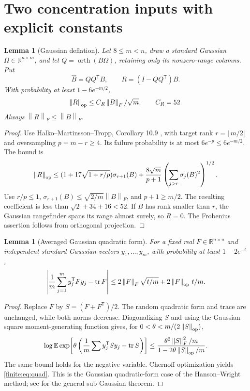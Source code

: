 \documentclass[11pt,oneside,openany,a4paper]{book}
\numberwithin{equation}{chapter}
\newtheorem{lemma}[theorem]{Lemma}
\theoremstyle{definition}
\theoremstyle{remark}
\newcommand{\R}{\mathbb R}\newcommand{\E}{\mathbb E}\newcommand{\Prb}{\mathbb P}\newcommand{\PP}{\mathbb P}
\newcommand{\T}{\mathsf T}\newcommand{\Id}{I}
\newcommand{\F}[1]{\left\lVert#1\right\rVert_F}
\newcommand{\op}[1]{\left\lVert#1\right\rVert_{\rm op}}
\DeclareMathOperator{\tr}{tr}\DeclareMathOperator{\rank}{rank}
\DeclareMathOperator{\orth}{orth}\DeclareMathOperator*{\argmin}{arg\,min}
\begin{document}
\section{Two concentration inputs with explicit constants}
\begin{lemma}[Gaussian deflation]\label{finite:lem:range}
Let $8\le m<n$, draw a standard Gaussian $\Omega\in\R^{n\times m}$, and let $Q=\orth(B\Omega)$, retaining only its nonzero-range columns. Put
\[
\widehat B=QQ^\T B,\qquad R=(I-QQ^\T)B.
\]
With probability at least $1-6e^{-m/2}$,
\begin{equation}\label{finite:eq:range}
\op R\le C_R\F B/\sqrt m,\qquad C_R=52.
\end{equation}
Always $\F R\le\F B$.
\end{lemma}
\begin{proof}
Use Halko--Martinsson--Tropp, Corollary 10.9 \cite{HMT}, with target rank $r=\lfloor m/2\rfloor$ and oversampling $p=m-r\ge4$. Its failure probability is at most $6e^{-p}\le6e^{-m/2}$. The bound is
\[
\op R\le
(1+17\sqrt{1+r/p})\sigma_{r+1}(B)
+\frac{8\sqrt m}{p+1}\left(\sum_{j>r}\sigma_j(B)^2\right)^{1/2}.
\]
Use $r/p\le1$, $\sigma_{r+1}(B)\le\sqrt{2/m}\F B$, and $p+1\ge m/2$. The resulting coefficient is less than $\sqrt2+34+16<52$. If $B$ has rank smaller than $r$, the Gaussian rangefinder spans its range almost surely, so $R=0$. The Frobenius assertion follows from orthogonal projection.
\end{proof}

\begin{lemma}[Averaged Gaussian quadratic form]\label{finite:lem:quad}
For a fixed real $F\in\R^{n\times n}$ and independent standard Gaussian vectors $y_1,\ldots,y_m$, with probability at least $1-2e^{-t}$,
\begin{equation}\label{finite:eq:quad}
\left|\frac1m\sum_{j=1}^m y_j^\T Fy_j-\tr F\right|
\le 2\F F\sqrt{t/m}+2\op F\,t/m.
\end{equation}
\end{lemma}
\begin{proof}
Replace $F$ by $S=(F+F^\T)/2$. The random quadratic form and trace are unchanged, while both norms decrease. Diagonalizing $S$ and using the Gaussian square moment-generating function gives, for $0<\theta<m/(2\op S)$,
\[
\log\E\exp\!\left[\theta\left(\frac1m\sum y_j^\T Sy_j-\tr S\right)\right]
\le \frac{\theta^2\F S^2/m}{1-2\theta\op S/m}.
\]
The same bound holds for the negative variable. Chernoff optimization yields \eqref{finite:eq:quad}. This is the Gaussian quadratic-form case of the Hanson--Wright method; see \cite{RV} for the general sub-Gaussian theorem.
\end{proof}
\end{document}
